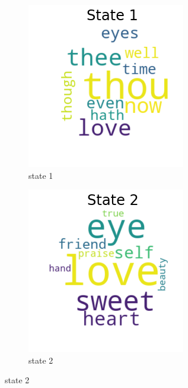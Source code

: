 \begin{figure}[H]
\begin{subfigure}[t]{0.3\textwidth}
		\includegraphics[width=\textwidth]{download(1).png}
		\caption{state 1}
	\end{subfigure}%
	\begin{subfigure}[t]{0.3\textwidth}
		\includegraphics[width=\textwidth]{download(2).png}
		\caption{state 2}
	\end{subfigure}%
	

\end{figure}
